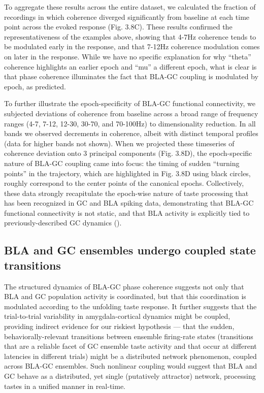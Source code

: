 \begin{refsection}
To aggregate these results across the entire dataset, we calculated the fraction of recordings in which coherence diverged significantly from baseline at each time point across the evoked response (Fig. 3.8C). These results confirmed the representativeness of the examples above, showing that 4-7Hz coherence tends to be modulated early in the response, and that 7-12Hz coherence modulation comes on later in the response. While we have no specific explanation for why “theta” coherence highlights an earlier epoch and “mu” a different epoch, what is clear is that phase coherence illuminates the fact that BLA-GC coupling is modulated by epoch, as predicted.

To further illustrate the epoch-specificity of BLA-GC functional connectivity, we subjected deviations of coherence from baseline across a broad range of frequency ranges (4-7, 7-12, 12-30, 30-70, and 70-100Hz) to dimensionality reduction. In all bands we observed decrements in coherence, albeit with distinct temporal profiles (data for higher bands not shown). When we projected these timeseries of coherence deviation onto 3 principal components (Fig. 3.8D), the epoch-specific nature of BLA-GC coupling came into focus: the timing of sudden “turning points” in the trajectory, which are highlighted in Fig. 3.8D using black circles, roughly correspond to the center points of the canonical epochs. Collectively, these data strongly recapitulate the epoch-wise nature of taste processing that has been recognized in GC and BLA spiking data, demonstrating that BLA-GC functional connectivity is not static, and that BLA activity is explicitly tied to previously-described GC dynamics (\cite{lin2021a}).

\subsection{BLA and GC ensembles undergo coupled state transitions}
The structured dynamics of BLA-GC phase coherence suggests not only that BLA and GC population activity is coordinated, but that this coordination is modulated according to the unfolding taste response. It further suggests that the trial-to-trial variability in amygdala-cortical dynamics might be coupled, providing indirect evidence for our riskiest hypothesis --- that the sudden, behaviorally-relevant transitions between ensemble firing-rate states (transitions that are a reliable facet of GC ensemble taste activity and that occur at different latencies in different trials) might be a distributed network phenomenon, coupled across BLA-GC ensembles. Such nonlinear coupling would suggest that BLA and GC behave as a distributed, yet single (putatively attractor) network, processing tastes in a unified manner in real-time.


\end{refsection}
